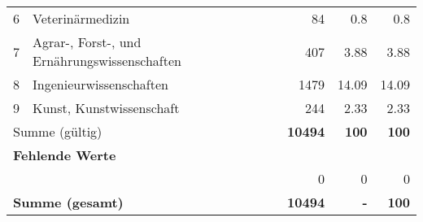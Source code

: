\begin{longtable}{lXrrr}
     6 &
     \multicolumn{1}{X}{ Veterinärmedizin   } &


       \num{84} &
       \num[round-mode=places,round-precision=2]{0,8} &
         \num[round-mode=places,round-precision=2]{0,8} \\

     7 &
     \multicolumn{1}{X}{ Agrar-, Forst-, und Ernährungswissenschaften   } &


       \num{407} &
       \num[round-mode=places,round-precision=2]{3,88} &
         \num[round-mode=places,round-precision=2]{3,88} \\

     8 &
     \multicolumn{1}{X}{ Ingenieurwissenschaften   } &


       \num{1479} &
       \num[round-mode=places,round-precision=2]{14,09} &
         \num[round-mode=places,round-precision=2]{14,09} \\

     9 &
     \multicolumn{1}{X}{ Kunst, Kunstwissenschaft   } &


       \num{244} &
       \num[round-mode=places,round-precision=2]{2,33} &
         \num[round-mode=places,round-precision=2]{2,33} \\
     \midrule
     \multicolumn{2}{l}{Summe (gültig)} &
       \textbf{\num{10494}} &
     \textbf{100} &
       \textbf{\num[round-mode=places,round-precision=2]{100}} \\
     \multicolumn{5}{l}{\textbf{Fehlende Werte}}\\
      & & 0 & 0 & 0 \\
     \midrule
     \multicolumn{2}{l}{\textbf{Summe (gesamt)}} &
          \textbf{\num{10494}} &
        \textbf{-} &
        \textbf{100} \\
     \bottomrule
     \end{longtable}
     

